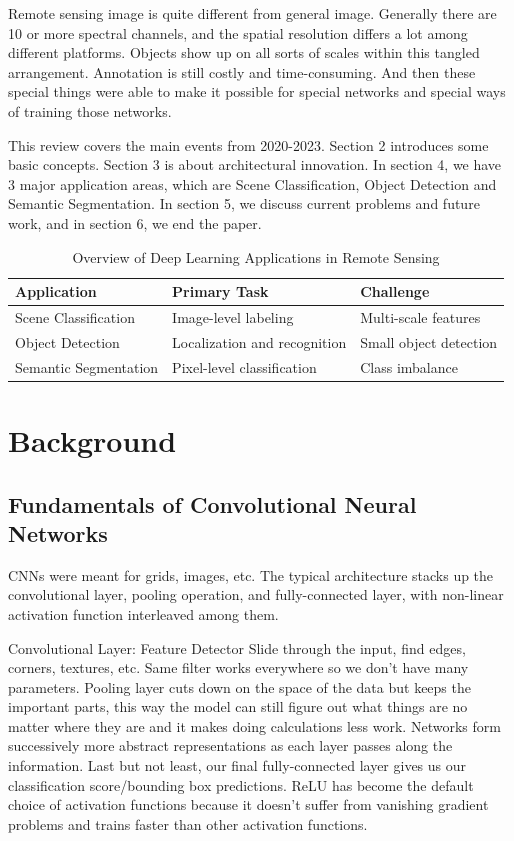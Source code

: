 \documentclass[12pt,a4paper]{article}
\begin{document}
Remote sensing image is quite different from general image. Generally there are 10 or more spectral channels, and the spatial resolution differs a lot among different platforms. Objects show up on all sorts of scales within this tangled arrangement. Annotation is still costly and time-consuming. And then these special things were able to make it possible for special networks and special ways of training those networks.

This review covers the main events from 2020-2023. Section 2 introduces some basic concepts. Section 3 is about architectural innovation. In section 4, we have 3 major application areas, which are Scene Classification, Object Detection and Semantic Segmentation. In section 5, we discuss current problems and future work, and in section 6, we end the paper.
\begin{table}[htbp]
\centering
\caption{Overview of Deep Learning Applications in Remote Sensing}
\label{tab:applications}
\begin{tabular}{@{}lll@{}}
\toprule
\textbf{Application} & \textbf{Primary Task} & \textbf{Challenge} \\
\midrule
Scene Classification & Image-level labeling & Multi-scale features \\
Object Detection & Localization and recognition & Small object detection \\
Semantic Segmentation & Pixel-level classification & Class imbalance \\
\bottomrule
\end{tabular}
\end{table}

\section{Background}
\label{sec:background}
\subsection{Fundamentals of Convolutional Neural Networks}
CNNs were meant for grids, images, etc. The typical architecture stacks up the convolutional layer, pooling operation, and fully-connected layer, with non-linear activation function interleaved among them.

Convolutional Layer: Feature Detector Slide through the input, find edges, corners, textures, etc. Same filter works everywhere so we don’t have many parameters. Pooling layer cuts down on the space of the data but keeps the important parts, this way the model can still figure out what things are no matter where they are and it makes doing calculations less work. Networks form successively more abstract representations as each layer passes along the information. Last but not least, our final fully-connected layer gives us our classification score/bounding box predictions. ReLU has become the default choice of activation functions because it doesn’t suffer from vanishing gradient problems and trains faster than other activation functions.
\end{document}
